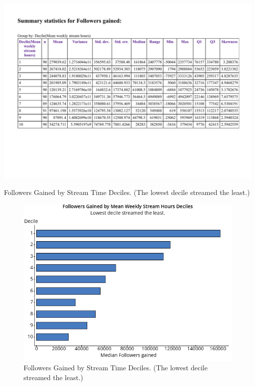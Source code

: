 \documentclass[12pt]{article}
\begin{document}
\begin{table}[H]
  \centering %
  \includegraphics[width=0.8\linewidth]{../StatCrunch_Results/followers_gained_stream_deciles/table}
  \captionsetup{justification=centering, singlelinecheck=false, margin=2cm}
  \caption[Followers Gained by Stream Time Deciles]{Followers Gained by Stream Time Deciles. (The lowest decile streamed the least.)}
  \label{table:followers_gained_stream_decile_table}
\end{table}


\begin{figure}[H]
  \centering %
  \includegraphics[width=0.6\linewidth]{../StatCrunch_Results/followers_gained_stream_deciles/barplot}
  \captionsetup{justification=centering, singlelinecheck=false, margin=2cm}
  \caption[Followers Gained by Stream Time Deciles]{Followers Gained by Stream Time Deciles. (The lowest decile streamed the least.)}
  \label{fig:followers_gained_stream_deciles}
\end{figure}
\end{document}
